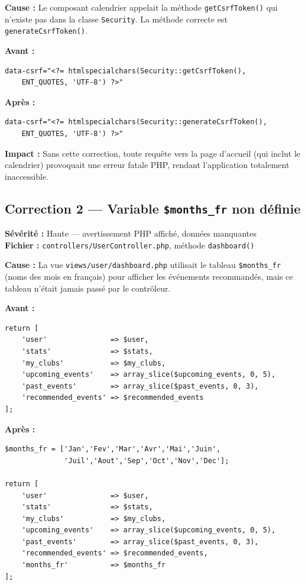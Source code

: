 \documentclass[12pt,a4paper]{article}
\begin{document}
\vspace{0.5cm}
\textbf{Cause :} Le composant calendrier appelait la méthode
\texttt{getCsrfToken()} qui n'existe pas dans la classe \texttt{Security}.
La méthode correcte est \texttt{generateCsrfToken()}.

\textbf{Avant :}
\begin{lstlisting}
data-csrf="<?= htmlspecialchars(Security::getCsrfToken(),
    ENT_QUOTES, 'UTF-8') ?>"
\end{lstlisting}

\textbf{Après :}
\begin{lstlisting}
data-csrf="<?= htmlspecialchars(Security::generateCsrfToken(),
    ENT_QUOTES, 'UTF-8') ?>"
\end{lstlisting}

\textbf{Impact :} Sans cette correction, toute requête vers la page d'accueil
(qui inclut le calendrier) provoquait une erreur fatale PHP, rendant
l'application totalement inaccessible.

\subsection{Correction 2 — Variable \texttt{\$months\_fr} non définie}

\begin{mdframed}[backgroundcolor=warning!20, linecolor=warning, linewidth=1.5pt]
\textbf{Sévérité :} Haute — avertissement PHP affiché, données manquantes\\
\textbf{Fichier :} \texttt{controllers/UserController.php}, méthode \texttt{dashboard()}
\end{mdframed}

\vspace{0.5cm}
\textbf{Cause :} La vue \texttt{views/user/dashboard.php} utilisait le tableau
\texttt{\$months\_fr} (noms des mois en français) pour afficher les événements
recommandés, mais ce tableau n'était jamais passé par le contrôleur.

\textbf{Avant :}
\begin{lstlisting}
return [
    'user'               => $user,
    'stats'              => $stats,
    'my_clubs'           => $my_clubs,
    'upcoming_events'    => array_slice($upcoming_events, 0, 5),
    'past_events'        => array_slice($past_events, 0, 3),
    'recommended_events' => $recommended_events
];
\end{lstlisting}

\textbf{Après :}
\begin{lstlisting}
$months_fr = ['Jan','Fev','Mar','Avr','Mai','Juin',
              'Juil','Aout','Sep','Oct','Nov','Dec'];

return [
    'user'               => $user,
    'stats'              => $stats,
    'my_clubs'           => $my_clubs,
    'upcoming_events'    => array_slice($upcoming_events, 0, 5),
    'past_events'        => array_slice($past_events, 0, 3),
    'recommended_events' => $recommended_events,
    'months_fr'          => $months_fr
];
\end{lstlisting}
\end{document}
